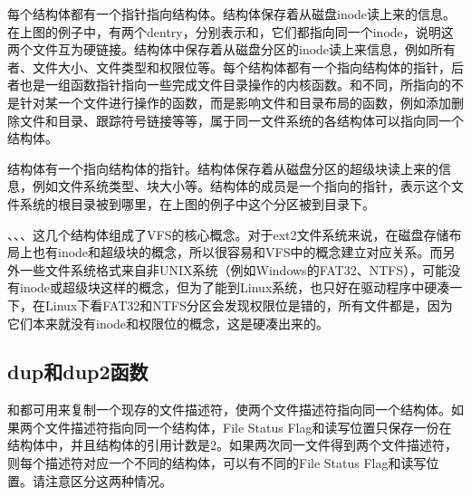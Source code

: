 每个结构体都有一个指针指向结构体。结构体保存着从磁盘inode读上来的信息。在上图的例子中，有两个dentry，分别表示和，它们都指向同一个inode，说明这两个文件互为硬链接。结构体中保存着从磁盘分区的inode读上来信息，例如所有者、文件大小、文件类型和权限位等。每个结构体都有一个指向结构体的指针，后者也是一组函数指针指向一些完成文件目录操作的内核函数。和不同，所指向的不是针对某一个文件进行操作的函数，而是影响文件和目录布局的函数，例如添加删除文件和目录、跟踪符号链接等等，属于同一文件系统的各结构体可以指向同一个结构体。



结构体有一个指向结构体的指针。结构体保存着从磁盘分区的超级块读上来的信息，例如文件系统类型、块大小等。结构体的成员是一个指向的指针，表示这个文件系统的根目录被到哪里，在上图的例子中这个分区被到目录下。



、、、这几个结构体组成了VFS的核心概念。对于ext2文件系统来说，在磁盘存储布局上也有inode和超级块的概念，所以很容易和VFS中的概念建立对应关系。而另外一些文件系统格式来自非UNIX系统（例如Windows的FAT32、NTFS），可能没有inode或超级块这样的概念，但为了能到Linux系统，也只好在驱动程序中硬凑一下，在Linux下看FAT32和NTFS分区会发现权限位是错的，所有文件都是，因为它们本来就没有inode和权限位的概念，这是硬凑出来的。


\subsection{dup和dup2函数}
%


和都可用来复制一个现存的文件描述符，使两个文件描述符指向同一个结构体。如果两个文件描述符指向同一个结构体，File Status Flag和读写位置只保存一份在结构体中，并且结构体的引用计数是2。如果两次同一文件得到两个文件描述符，则每个描述符对应一个不同的结构体，可以有不同的File Status Flag和读写位置。请注意区分这两种情况。


